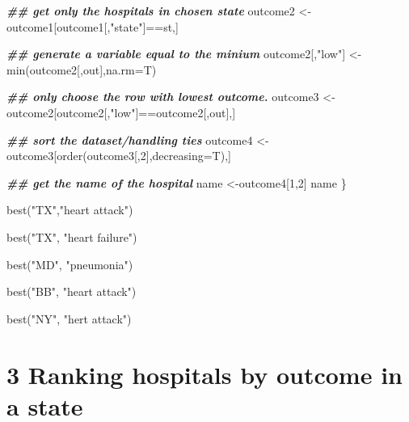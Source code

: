\documentclass[
]{article}
\newenvironment{Shaded}{\begin{snugshade}}{\end{snugshade}}
\newcommand{\AttributeTok}[1]{\textcolor[rgb]{0.77,0.63,0.00}{#1}}
\newcommand{\DecValTok}[1]{\textcolor[rgb]{0.00,0.00,0.81}{#1}}
\newcommand{\DocumentationTok}[1]{\textcolor[rgb]{0.56,0.35,0.01}{\textbf{\textit{#1}}}}
\newcommand{\FunctionTok}[1]{\textcolor[rgb]{0.00,0.00,0.00}{#1}}
\newcommand{\NormalTok}[1]{#1}
\newcommand{\OtherTok}[1]{\textcolor[rgb]{0.56,0.35,0.01}{#1}}
\newcommand{\SpecialCharTok}[1]{\textcolor[rgb]{0.00,0.00,0.00}{#1}}
\newcommand{\StringTok}[1]{\textcolor[rgb]{0.31,0.60,0.02}{#1}}
\begin{document}
\begin{Shaded}
\begin{Highlighting}[]
           \DocumentationTok{\#\# get only the hospitals in chosen state}
\NormalTok{          outcome2 }\OtherTok{\textless{}{-}}\NormalTok{ outcome1[outcome1[,}\StringTok{"state"}\NormalTok{]}\SpecialCharTok{==}\NormalTok{st,]}

          \DocumentationTok{\#\# generate a variable equal to the minium}
\NormalTok{          outcome2[,}\StringTok{"low"}\NormalTok{] }\OtherTok{\textless{}{-}} \FunctionTok{min}\NormalTok{(outcome2[,out],}\AttributeTok{na.rm=}\NormalTok{T)}

          \DocumentationTok{\#\# only choose the row with lowest outcome.}
\NormalTok{          outcome3 }\OtherTok{\textless{}{-}}\NormalTok{ outcome2[outcome2[,}\StringTok{"low"}\NormalTok{]}\SpecialCharTok{==}\NormalTok{outcome2[,out],]}

          \DocumentationTok{\#\# sort the dataset/handling ties}
\NormalTok{          outcome4 }\OtherTok{\textless{}{-}}\NormalTok{ outcome3[}\FunctionTok{order}\NormalTok{(outcome3[,}\DecValTok{2}\NormalTok{],}\AttributeTok{decreasing=}\NormalTok{T),]}

          \DocumentationTok{\#\# get the name of the hospital}
\NormalTok{          name }\OtherTok{\textless{}{-}}\NormalTok{outcome4[}\DecValTok{1}\NormalTok{,}\DecValTok{2}\NormalTok{]}
\NormalTok{          name}
\NormalTok{\}}
\end{Highlighting}
\end{Shaded}

\begin{Shaded}
\begin{Highlighting}[]
\FunctionTok{best}\NormalTok{(}\StringTok{"TX"}\NormalTok{,}\StringTok{"heart attack"}\NormalTok{)}

\FunctionTok{best}\NormalTok{(}\StringTok{"TX"}\NormalTok{, }\StringTok{"heart failure"}\NormalTok{)}

\FunctionTok{best}\NormalTok{(}\StringTok{"MD"}\NormalTok{, }\StringTok{"pneumonia"}\NormalTok{)}

\FunctionTok{best}\NormalTok{(}\StringTok{"BB"}\NormalTok{, }\StringTok{"heart attack"}\NormalTok{)}

\FunctionTok{best}\NormalTok{(}\StringTok{"NY"}\NormalTok{, }\StringTok{"hert attack"}\NormalTok{)}
\end{Highlighting}
\end{Shaded}

\hypertarget{ranking-hospitals-by-outcome-in-a-state}{%
\section{3 Ranking hospitals by outcome in a
state}\label{ranking-hospitals-by-outcome-in-a-state}}
\end{document}
